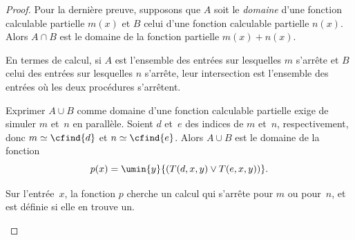 \documentclass[../../../include/open-logic-section]{subfiles}
\begin{document}
\begin{proof}
Pour la dernière preuve, supposons que $A$ soit
le \emph{domaine} d'une fonction calculable partielle
$m(x)$ et $B$ celui d'une fonction calculable
partielle $n(x)$. Alors $A\cap B$ est le domaine
de la fonction partielle $m(x)+n(x)$.

\begin{explain}
En termes de calcul, si $A$ est l'ensemble des
entrées sur lesquelles $m$ s'arrête et $B$ celui
des entrées sur lesquelles $n$ s'arrête, leur
intersection est l'ensemble des entrées où les
deux procédures s'arrêtent.
\end{explain}

Exprimer $A\cup B$ comme domaine d'une fonction
calculable partielle exige de simuler $m$ et~$n$
en parallèle. Soient $d$ et~$e$ des indices de
$m$ et~$n$, respectivement, donc
$m\simeq\cfind{d}$ et $n\simeq\cfind{e}$.
Alors $A\cup B$ est le domaine de la fonction
\[
p(x) = \umin{y}{(T(d,x,y) \lor T(e,x,y))}.
\]
\begin{explain}
Sur l'entrée~$x$, la fonction $p$ cherche un
calcul qui s'arrête pour $m$ ou pour~$n$, et
est définie si elle en trouve un.
\end{explain}
\end{proof}
\end{document}
